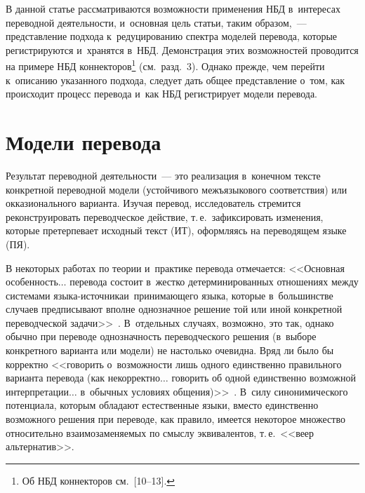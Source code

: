\begin{multicols}{2}
\addtocounter{footnote}{2}
  
  В данной статье рассматриваются возможности применения НБД в~интересах 
переводной деятельности, и~основная цель статьи, таким образом,~--- 
представление подхода к~редуцированию спектра моделей перевода, которые 
регистрируются и~хранятся в~НБД. Демонстрация 
этих возможностей проводится на примере НБД коннекторов\footnote{Об НБД 
коннекторов см.\ [10--13].} (см.\ разд.~3). Однако прежде, чем перейти к~описанию 
указанного подхода, следует дать общее представление о~том, как происходит 
процесс перевода и~как НБД регистрирует модели перевода.

  
  \section{Модели перевода}
  
  
  Результат переводной деятельности~--- это реализация в~конечном тексте 
конкретной переводной модели (устойчивого межъязыкового соответствия) или 
окказионального варианта. Изучая перевод, исследователь стремится 
реконструировать переводческое действие, т.\,е.\ зафиксировать изменения, 
которые претерпевает исходный текст (ИТ), оформляясь на переводящем языке 
(ПЯ).
  
  В некоторых работах по теории и~практике перевода отмечается: <<Основная 
особенность$\ldots$ перевода состоит в~жестко детерминированных от\-ношениях 
между системами языка-источника\linebreak и~принимающего языка, которые 
в~большинстве случаев предписывают вполне однозначное решение той или иной 
конкретной переводческой задачи>>~\cite[с.~47]{14-nur}. В~отдельных случаях, 
возможно, это так, однако обычно при переводе однозначность переводческого 
решения (в~выборе конкретного варианта или модели) не настолько очевидна. 
Вряд ли было бы корректно <<говорить о~возможности лишь одного единственно 
правильного варианта перевода (как некорректно$\ldots$ говорить об одной 
единственно возможной интерпретации$\ldots$ в~обычных условиях 
общения)>>~\cite[с.~22]{15-nur}. В~силу синонимического потенциала, которым 
обладают естественные языки, вместо единственно возможного решения при 
переводе, как правило, имеется некоторое множество относительно 
взаимозаменяемых по смыслу эквивалентов, т.\,е.\ <<веер альтернатив>>.
{ %

}
\end{multicols}
